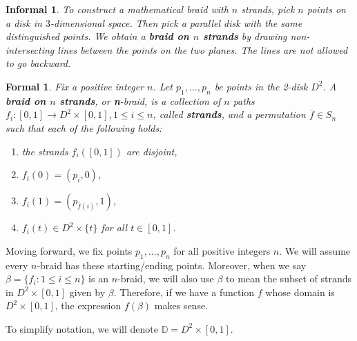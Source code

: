 \documentclass{amsart}
\newtheorem*{formal}{Formal}
\newtheorem*{informal}{Informal}
\begin{document}
\begin{definition}
	\label{braids}
	\begin{informal}
		To construct a mathematical braid with \(n\) strands,	pick \(n\)
		points on a disk in \(3\)-dimensional space. Then pick a parallel
		disk with the same distinguished points. We obtain a \textbf{braid on
		\(n\) strands} by drawing non-intersecting lines between the points
		on the two planes. The lines are not allowed to go backward.
	\end{informal}
	\begin{formal}
		Fix a positive integer \(n\). Let \(p_1, \ldots, p_n\) be points in the
		2-disk \(D^2\).
		A \textbf{braid on \(n\) strands}, or \textbf{n}-braid, is a collection
		of \(n\) paths \(f_i: [0,
		1]\to D^2\times [0, 1], 1\le i\le n\), called \textbf{strands}, and a
		permutation \(\overline{f}\in S_n\) such that each of the following holds: 
		\begin{enumerate}[label=(\roman*)]
			\item the strands \(f_i([0, 1])\) are disjoint,
			\item \(f_i(0) = (p_i, 0)\),
			\item \(f_i(1) = (p_{\overline{f}(i)}, 1)\),
			\item \(f_i(t)\in D^2\times\{t\}\) for all \(t\in[0, 1]\).
		\end{enumerate}
	\end{formal}
\end{definition}

Moving forward, we fix points \(p_1, \ldots, p_n\) for all positive integers
\(n\). We will assume every \(n\)-braid has these starting/ending points.
Moreover, when we say \(\beta = \{f_i : 1\le i\le n\}\) is an \(n\)-braid, we
will also use \(\beta\) to mean the subset of strands in \(D^2\times[0, 1]\)
given by \(\beta\). Therefore, if we have a function \(f\) whose domain is
\(D^2\times[0, 1]\), the expression \(f(\beta)\) makes sense.

To simplify notation, we will denote \(\mathbb{D} =
D^2\times[0, 1]\).
\end{document}
